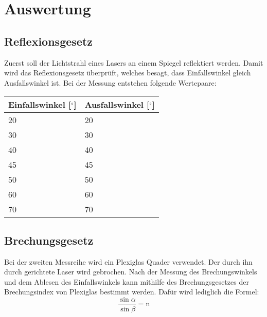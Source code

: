 \section{Auswertung}

\subsection{Reflexionsgesetz}

Zuerst soll der Lichtstrahl eines Lasers an einem Spiegel reflektiert werden. Damit wird das Reflexionsgesetz überprüft, welches besagt, dass Einfallswinkel \alpha gleich Ausfallswinkel \beta ist. Bei der Messung entstehen folgende Wertepaare:

\begin{minipage}{\linewidth}
    \begin{table}[H]
        \centering
    \begin{tabular}{ll}
        \toprule
        Einfallswinkel [$^\circ$] & Ausfallswinkel [$^\circ$] \\
        \midrule
        20 & 20 \\
        30 & 30 \\
        40 & 40 \\
        45 & 45 \\
        50 & 50 \\
        60 & 60 \\
        70 & 70 \\
        \bottomrule   
    \end{tabular}
    
    \label{tab:1}
\end{table}
\end{minipage}

\subsection{Brechungsgesetz}

Bei der zweiten Messreihe wird ein Plexiglas Quader verwendet. Der durch ihn durch gerichtete Laser wird gebrochen. Nach der Messung des Brechungswinkels und dem Ablesen des Einfallswinkels kann mithilfe des Brechungsgesetzes der Brechungsindex von Plexiglas bestimmt werden.
Dafür wird lediglich die Formel:
\begin{displaymath}
    \frac{\sin\alpha}{\sin\beta} = \text{n}
\end{displaymath}

